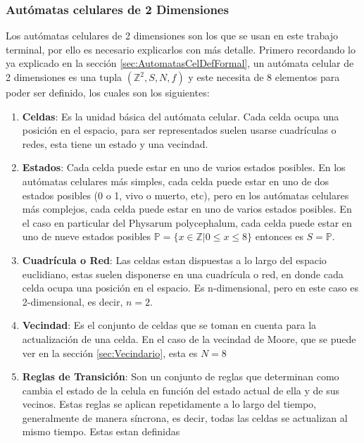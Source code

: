 \subsubsection{Aut\'omatas celulares de 2 Dimensiones}
\label{sec:AutomatasCel2D}

    Los aut\'omatas celulares de 2 dimensiones son los que se usan en este trabajo terminal, por ello es necesario
        explicarlos con m\'as detalle. Primero recordando lo ya explicado en la secci\'on \ref{sec:AutomatasCelDefFormal}, un aut\'omata
        celular de 2 dimensiones es una tupla $({\mathbb{Z}^{2}},S,N,f)$ y este 
        necesita de 8 elementos para poder ser definido, los cuales son los siguientes:         
    \begin{enumerate}
        \item \textbf{Celdas}: Es la unidad b\'asica del aut\'omata celular. Cada celda ocupa una posici\'on en el espacio, 
            para ser representados suelen usarse cuadr\'iculas o redes, esta tiene un estado y una vecindad.
        \item \textbf{Estados}: Cada celda puede estar en uno de varios estados posibles. En los aut\'omatas celulares
            m\'as simples, cada celda puede estar en uno de dos estados posibles (0 o 1, vivo o muerto, etc), pero en los 
            aut\'omatas celulares m\'as complejos, cada celda puede estar en uno de varios estados posibles. En el caso 
            en particular del Physarum polycephalum, cada celda puede estar en uno de nueve estados posibles 
            $\mathbb{P} = \{x \in \mathbb{Z}| 0 \leq x \leq 8\}$ entonces es $S = \mathbb{P}$.
        \item \textbf{Cuadr\'icula o Red}: Las celdas estan dispuestas a lo largo del espacio euclidiano, estas 
            suelen disponerse en una cuadr\'icula o red, en donde cada celda ocupa una posici\'on en el espacio. Es
            n-dimensional, pero en este caso es 2-dimensional, es decir, $n = 2$.
        \item \textbf{Vecindad}: Es el conjunto de celdas que se toman en cuenta para la actualizaci\'on de una celda. En el caso de
            la vecindad de Moore, que se puede ver en la secci\'on \ref{sec:Vecindario}, esta es $N = 8$
        \item \textbf{Reglas de Transici\'on}: Son un conjunto de reglas que determinan como cambia el estado de la celula en 
            funci\'on del estado actual de ella y de sus vecinos. Estas reglas se aplican repetidamente a lo largo del tiempo,
            generalmente de manera s\'incrona, es decir, todas las celdas se actualizan al mismo tiempo. Estas estan definidas 

\end{enumerate}
